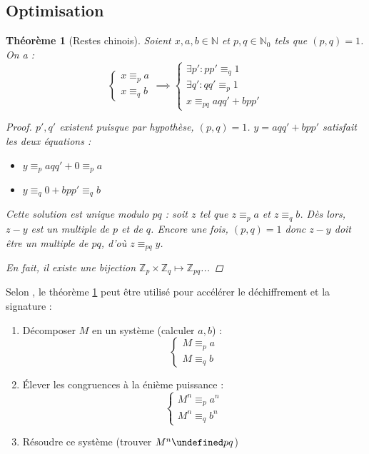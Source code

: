 \documentclass[11pt,twocolumn]{article}
\let\mod\undefined
\DeclareMathOperator{\mod}{mod}
\theoremstyle{plain}
\newtheorem{thm}{Théorème}
\newcommand{\esN}{\mathbb{N}} %
\newcommand{\esZ}{\mathbb{Z}} %
\begin{document}
\subsection{Optimisation}
\begin{thm}[Restes chinois]\label{thm:chrem}
	Soient $x,a,b \in \esN$ et $p,q \in \esN_0$ tels que $(p,q)=1$. On a : \[
		\left\{\begin{array}{ll}
			x \equiv_p a \\
			x \equiv_q b
		\end{array}\right.
		\implies
		\left\{\begin{array}{l}
			\exists p' : pp'\equiv_q1 \\
			\exists q' : qq'\equiv_p1 \\
			x \equiv_{pq} aqq'+bpp'
		\end{array}\right.
	\]
	\begin{proof}
		$p', q'$ existent puisque par hypothèse, $(p,q)=1$.
		$y=aqq'+bpp'$ satisfait les deux équations :
		\begin{itemize}
			\item $y \equiv_p aqq' + 0 \equiv_p a$
			\item $y \equiv_q 0 + bpp' \equiv_q b$
		\end{itemize}

		Cette solution est unique modulo $pq$ : soit $z$ tel que
		$z \equiv_p a$ et $z \equiv_q b$. Dès lors, $z-y$ est un multiple de $p$
		et de $q$. Encore une fois, $(p,q)=1$ donc $z-y$ doit être un multiple
		de $pq$, d'où $z \equiv_{pq} y$.

		En fait, il existe une bijection
		$\esZ_p \times \esZ_q \mapsto \esZ_{pq}$...
	\end{proof}
\end{thm}

Selon \cite[p. 611]{hac}, le théorème \ref{thm:chrem} peut être utilisé
pour accélérer le déchiffrement et la signature :
\begin{enumerate}
	\item Décomposer $M$ en un système (calculer $a, b$) : \[
		\left\{\begin{array}{ll}
			M \equiv_p a \\
			M \equiv_q b
		\end{array}\right.
	\]
	\item Élever les congruences à la énième puissance : \[
		\left\{\begin{array}{ll}
			M^n \equiv_p a^n \\
			M^n \equiv_q b^n
		\end{array}\right.
	\]
	\item Résoudre ce système (trouver $M^n \mod pq$)
\end{enumerate}
\end{document}

